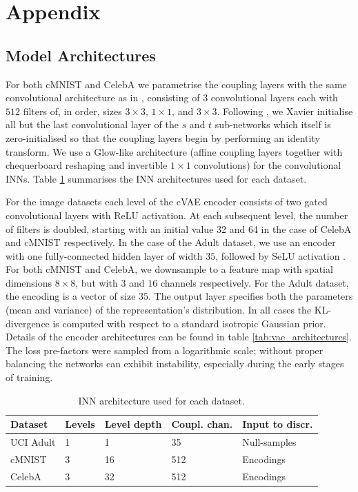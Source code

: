 \section{Appendix}\label{sec:nifr-appendix}
%
\subsection{Model Architectures}
%
\label{sec:architectures}
%
\noindent For both cMNIST and CelebA we parametrise the coupling layers with the same convolutional
architecture as in \citet{KinDha18}, consisting of $3$ convolutional layers each with $512$ filters
of, in order, sizes $3\times3$, $1\times1$, and $3\times3$. 
%
Following \citet{ardizzone2019guided}, we Xavier initialise all but the last convolutional layer of
the $s$ and $t$ sub-networks which itself is zero-initialised so that the coupling layers begin by
performing an identity transform. 
%
We use a Glow-like architecture \citep{KinDha18} (affine coupling layers together with
chequerboard reshaping and invertible $1\times1$ convolutions) for the convolutional INNs. 
%
Table \ref{tab:inn_architectures} summarises the INN architectures used for each dataset.

For the image datasets each level of the \ac{cVAE} encoder consists of two gated convolutional layers
\citep{van2016conditional} with ReLU activation. 
%
At each subsequent level, the number of filters is doubled, starting with an initial value 32 and
64 in the case of CelebA and cMNIST respectively. 
%
In the case of the Adult dataset, we use an encoder with one fully-connected hidden layer of width
$35$, followed by SeLU activation \citep{klambauer2017self}. 
%
For both cMNIST and CelebA, we downsample to a feature map with spatial dimensions $8\times8$, but
with $3$ and $16$ channels respectively. 
%
For the Adult dataset, the encoding is a vector of size $35$. 
%
The output layer specifies both the parameters (mean and variance) of the representation's
distribution. 
%
In all cases the KL-divergence is computed with respect to a standard isotropic Gaussian prior. 
%
Details of the encoder architectures can be found in table \ref{tab:vae_architectures}. 
%
The loss pre-factors were sampled from a logarithmic scale; without proper balancing the networks
can exhibit instability, especially during the early stages of training.

\begin{table}[tp]
\caption{INN architecture used for each dataset.}
\label{tab:inn_architectures}
\centering
\begin{tabular}{lllll}
\toprule
Dataset & Levels & Level depth & Coupl. chan. & Input to discr. \\ \midrule
UCI Adult                   & 1      & 1     & 35       & Null-samples       \\
cMNIST                      & 3      & 16     & 512      & Encodings               \\
CelebA                      & 3      & 32     & 512      & Encodings        \\ \bottomrule
\end{tabular}
\end{table}

